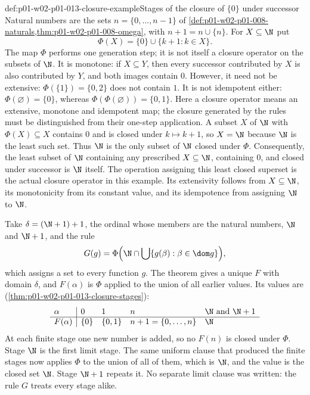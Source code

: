 \begin{hbexample}{def:p01-w02-p01-013-closure-example}{Stages of the closure of \(\{0\}\) under successor}
Natural numbers are the sets \(n=\{0,\ldots,n-1\}\) of
\cref{def:p01-w02-p01-008-naturals,thm:p01-w02-p01-008-omega}, with \(n+1=n\cup\{n\}\). For
\(X\subseteq\N\) put
\[
  \Phi(X)=\{0\}\cup\{k+1:k\in X\}.
\]
The map \(\Phi\) performs one generation step; it is not itself a closure
operator on the subsets of \(\N\). It is monotone: if \(X\subseteq Y\),
then every successor contributed by \(X\) is also contributed by \(Y\),
and both images contain \(0\). However, it need not be extensive:
\(\Phi(\{1\})=\{0,2\}\) does not contain \(1\). It is not idempotent either:
\(\Phi(\varnothing)=\{0\}\), whereas
\(\Phi(\Phi(\varnothing))=\{0,1\}\).
Here a closure operator means an extensive, monotone and idempotent map;
the closure generated by the rules must be distinguished from their
one-step application.
A subset \(X\) of \(\N\) with \(\Phi(X)\subseteq X\) contains \(0\) and is
closed under \(k\mapsto k+1\), so \(X=\N\) because \(\N\) is the least such
set. Thus \(\N\) is the only subset of \(\N\) closed under \(\Phi\).
Consequently, the least subset of \(\N\) containing any prescribed
\(X\subseteq\N\), containing \(0\), and closed under successor is \(\N\)
itself. The operation assigning this least closed superset is the actual
closure operator in this example. Its extensivity follows from
\(X\subseteq\N\), its monotonicity from its constant value, and its
idempotence from assigning \(\N\) to \(\N\).

Take \(\delta=(\N+1)+1\), the ordinal whose members are the natural numbers,
\(\N\) and \(\N+1\), and the rule
\[
  G(g)=\Phi\Bigl(\N\cap\bigcup\{g(\beta):\beta\in\dom g\}\Bigr),
\]
which assigns a set to every function \(g\). The theorem gives a unique
\(F\) with domain \(\delta\), and \(F(\alpha)\) is \(\Phi\) applied to the
union of all earlier values. Its values are
(\cref{thm:p01-w02-p01-013-closure-stages}):
\[
  \begin{array}{l|llll}
    \alpha & 0 & 1 & n & \N \text{ and } \N+1\\ \hline
    F(\alpha) & \{0\} & \{0,1\} & n+1=\{0,\ldots,n\} & \N
  \end{array}
\]
At each finite stage one new number is added, so no \(F(n)\) is closed under
\(\Phi\). Stage \(\N\) is the first limit stage. The same uniform clause
that produced the finite stages now applies \(\Phi\) to the union of all of
them, which is \(\N\), and the value is the closed set \(\N\). Stage
\(\N+1\) repeats it. No separate limit clause was written: the rule \(G\)
treats every stage alike.
\end{hbexample}

